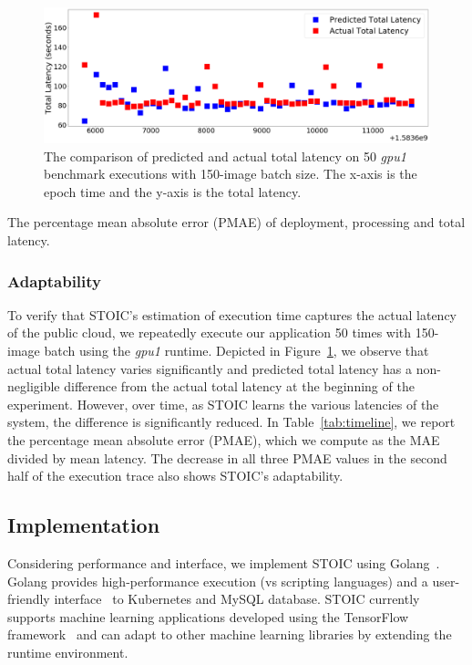  \begin{figure}
    \centering
    \includegraphics[scale=0.14]{figures/timeline.png}
    \caption{The comparison of predicted and actual total latency on 50 \textit{gpu1} benchmark executions with 150-image batch size. The x-axis is the epoch time and the y-axis is the total latency. \label{fig:timeline}}
\end{figure}

\begin{table}
\centering

\caption{The percentage mean absolute error (PMAE) of deployment, processing and total latency.  \label{tab:timeline}}
\end{table}
 
 \subsubsection{Adaptability}
 
To verify that STOIC's estimation of execution time captures the actual latency of the public cloud, we repeatedly execute our application 50 times with 150-image batch using the \textit{gpu1} runtime. Depicted in Figure~\ref{fig:timeline}, we observe that actual total latency varies significantly and predicted total latency has a non-negligible difference from the actual total latency at the beginning of the experiment. However, over time, as STOIC learns the various latencies of the system, the difference is significantly reduced. In Table~\ref{tab:timeline}, we report the percentage mean absolute error (PMAE), which we compute as the MAE divided by mean latency. The decrease in all three PMAE values in the second half of the execution trace also shows STOIC's adaptability.
 

 \subsection{Implementation}

Considering performance and interface, we implement STOIC using Golang~\cite{ref:golang}. Golang provides high-performance execution (vs scripting languages) and a user-friendly interface~\cite{ref:client-go} to Kubernetes and MySQL database. STOIC currently supports machine learning applications developed using the TensorFlow framework~\cite{ref:tensorflow} and can adapt to other machine learning libraries by extending the runtime environment.
 
